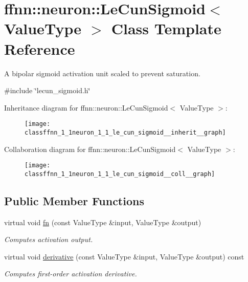 \hypertarget{classffnn_1_1neuron_1_1_le_cun_sigmoid}{\section{ffnn\-:\-:neuron\-:\-:Le\-Cun\-Sigmoid$<$ Value\-Type $>$ Class Template Reference}
\label{classffnn_1_1neuron_1_1_le_cun_sigmoid}
}


A bipolar sigmoid activation unit scaled to prevent saturation.  




{\ttfamily \#include \char`\"{}lecun\-\_\-sigmoid.\-h\char`\"{}}



Inheritance diagram for ffnn\-:\-:neuron\-:\-:Le\-Cun\-Sigmoid$<$ Value\-Type $>$\-:\nopagebreak
\begin{figure}[H]
\begin{center}
\leavevmode
\texttt{[image: classffnn\_1\_1neuron\_1\_1\_le\_cun\_sigmoid\_\_inherit\_\_graph]}
\end{center}
\end{figure}


Collaboration diagram for ffnn\-:\-:neuron\-:\-:Le\-Cun\-Sigmoid$<$ Value\-Type $>$\-:\nopagebreak
\begin{figure}[H]
\begin{center}
\leavevmode
\texttt{[image: classffnn\_1\_1neuron\_1\_1\_le\_cun\_sigmoid\_\_coll\_\_graph]}
\end{center}
\end{figure}
\subsection*{Public Member Functions}
\begin{DoxyCompactItemize}
\item 
virtual void \hyperlink{classffnn_1_1neuron_1_1_le_cun_sigmoid_abac0c8e08b1289c288923fd8e6f12ce2}{fn} (const Value\-Type \&input, Value\-Type \&output)
\begin{DoxyCompactList}\small\item\em Computes activation output. \end{DoxyCompactList}\item 
virtual void \hyperlink{classffnn_1_1neuron_1_1_le_cun_sigmoid_a4802deb108ab8ca6a67a4d7d55124fb2}{derivative} (const Value\-Type \&input, Value\-Type \&output) const 
\begin{DoxyCompactList}\small\item\em Computes first-\/order activation derivative. \end{DoxyCompactList}\end{DoxyCompactItemize}


